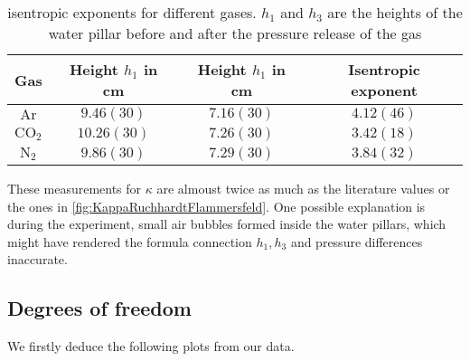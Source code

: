 \documentclass[../main.tex]{subfiles}
\begin{document}
            \begin{table}[H]
                \centering
                \begin{tabular}{c|cc|c}
                    \textbf{Gas} & \textbf{Height $h_1$ in cm} & \textbf{Height $h_1$ in cm} & \textbf{Isentropic exponent}\\
                    \hline
                    $\text{Ar}$ & $9.46(30)$ & $7.16(30)$ & $4.12(46)$\\
                    $\text{CO}_2$ & $10.26(30)$ & $7.26(30)$ & $3.42(18)$\\
                    $\text{N}_2$ & $9.86(30)$ & $7.29(30)$ & $3.84(32)$\\
                \end{tabular}
                \caption{isentropic exponents for different gases. $h_1$ and $h_3$ are the heights of the water pillar before and after the pressure release of the gas}
            \end{table}
            
            \noindent These measurements for $\kappa$ are almoust twice as much as the literature values or the ones in \ref{fig:KappaRuchhardtFlammersfeld}. One possible explanation is during the experiment, small air bubbles formed inside the water pillars, which might have rendered the formula connection $h_1,h_3$ and pressure differences inaccurate.

    \subsection{Degrees of freedom}
        We firstly deduce the following plots from our data. 
\end{document}

